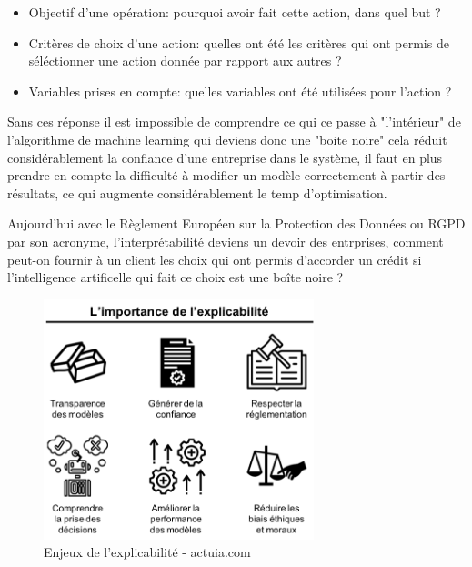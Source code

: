             \begin{itemize}
                \item Objectif d'une opération: pourquoi avoir fait cette action, 
                dans quel but ? \newline 
                \item Critères de choix d'une action: quelles ont été les critères 
                qui ont permis de séléctionner une action donnée par rapport aux 
                autres ? \newline
                \item Variables prises en compte: quelles variables ont été utilisées
                pour l'action ? \newline 
            \end{itemize}

            Sans ces réponse il est impossible de comprendre ce qui ce passe à "l'intérieur"
            de l'algorithme de machine learning qui deviens donc une "boite noire"
            cela réduit considérablement la confiance d'une entreprise dans le système,
            il faut en plus prendre en compte la difficulté à modifier un modèle correctement à 
            partir des résultats, ce qui augmente considérablement le temp d'optimisation.
            \newline

            Aujourd'hui avec le Règlement Européen sur la Protection des Données ou RGPD par son 
            acronyme, l'interprétabilité deviens un devoir des entrprises, comment 
            peut-on fournir à un client les choix qui ont permis d'accorder un crédit
            si l'intelligence artificelle qui fait ce choix est une boîte noire ?
            
            \begin{figure}[H]
                \centering
                \includegraphics[width=0.7\textwidth]{Images/explicabilite}
                \caption{Enjeux de l'explicabilité - actuia.com}
                \label{fig:explicability}
            \end{figure}

